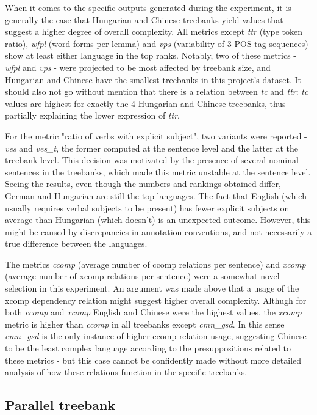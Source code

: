 \documentclass[11pt]{article}
\begin{document}
When it comes to the specific outputs generated during the experiment, it is generally the case that Hungarian and Chinese treebanks yield values that suggest a higher degree of overall complexity. All metrics except \emph{ttr} (type token ratio), \emph{wfpl} (word forms per lemma) and \emph{vps} (variability of 3 POS tag sequences) show at least either language in the top ranks. Notably, two of these metrics - \emph{wfpl} and \emph{vps} - were projected to be most affected by treebank size, and Hungarian and Chinese have the smallest treebanks in this project's dataset. It should also not go without mention that there is a relation between \emph{tc} and \emph{ttr}: \emph{tc} values are highest for exactly the 4 Hungarian and Chinese treebanks, thus partially explaining the lower expression of \emph{ttr}.

For the metric "ratio of verbs with explicit subject", two variants were reported - \emph{ves} and \emph{ves\_t}, the former computed at the sentence level and the latter at the treebank level. This decision was motivated by the presence of several nominal sentences in the treebanks, which made this metric unstable at the sentence level. Seeing the results, even though the numbers and rankings obtained differ, German and Hungarian are still the top languages. The fact that English (which usually requires verbal subjects to be present) has fewer explicit subjects on average than Hungarian (which doesn't) is an unexpected outcome. However, this might be caused by discrepancies in annotation conventions, and not necessarily a true difference between the languages.

The metrics \emph{ccomp} (average number of ccomp relations per sentence) and \emph{xcomp} (average number of xcomp relations per sentence) were a somewhat novel selection in this experiment. An argument was made above that a usage of the xcomp dependency relation might suggest higher overall complexity. Althugh for both \emph{ccomp} and \emph{xcomp} English and Chinese were the highest values, the \emph{xcomp} metric is higher than \emph{ccomp} in all treebanks except \emph{cmn\_gsd}. In this sense \emph{cmn\_gsd} is the only instance of higher ccomp relation usage, suggesting Chinese to be the least complex language according to the presuppositions related to these metrics - but this case cannot be confidently made without more detailed analysis of how these relations function in the specific treebanks.

\subsection{Parallel treebank}
\end{document}

